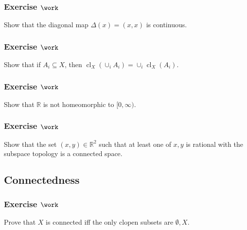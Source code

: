\hypertarget{exercise-work-1}{%
\subsubsection{\texorpdfstring{Exercise
\(\work\)}{Exercise \textbackslash work}}\label{exercise-work-1}}

Show that the diagonal map \(\Delta(x) = (x, x)\) is continuous.

\hypertarget{exercise-work-2}{%
\subsubsection{\texorpdfstring{Exercise
\(\work\)}{Exercise \textbackslash work}}\label{exercise-work-2}}

Show that if \(A_i \subseteq X\), then
\({ \operatorname{cl}} _X(\cup_i A_i) = \cup_i { \operatorname{cl}} _X(A_i)\).

\hypertarget{exercise-work-3}{%
\subsubsection{\texorpdfstring{Exercise
\(\work\)}{Exercise \textbackslash work}}\label{exercise-work-3}}

Show that \({\mathbb{R}}\) is not homeomorphic to \([0, \infty)\).

\hypertarget{exercise-work-4}{%
\subsubsection{\texorpdfstring{Exercise
\(\work\)}{Exercise \textbackslash work}}\label{exercise-work-4}}

Show that the set \((x, y) \in {\mathbb{R}}^2\) such that at least one
of \(x, y\) is rational with the subspace topology is a connected space.

\hypertarget{connectedness-1}{%
\subsection{Connectedness}\label{connectedness-1}}

\hypertarget{exercise-work-5}{%
\subsubsection{\texorpdfstring{Exercise
\(\work\)}{Exercise \textbackslash work}}\label{exercise-work-5}}

Prove that \(X\) is connected iff the only clopen subsets are
\(\emptyset, X\).

